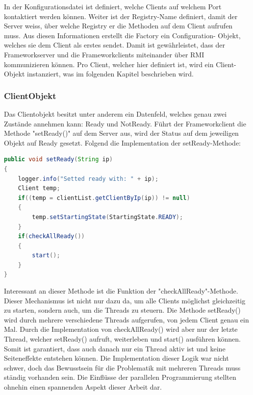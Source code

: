 In der Konfigurationsdatei ist definiert, welche Clients auf welchem Port kontaktiert werden können. Weiter ist der Registry-Name definiert, damit der Server weiss, über welche Registry er die Methoden auf dem Client aufrufen muss. \newline
Aus diesen Informationen erstellt die Factory ein Configuration- Objekt, welches sie dem Client als erstes sendet. Damit ist gewährleistet, dass der Frameworkserver und die Frameworkclients miteinander über RMI kommunizieren können. \newline
Pro Client, welcher hier definiert ist, wird ein Client-Objekt instanziert, was im folgenden Kapitel beschrieben wird.

\subsubsection{ClientObjekt}
\label{sec:ClientObjekt}

Das Clientobjekt besitzt unter anderem ein Datenfeld, welches genau zwei Zustände annehmen kann: Ready und NotReady. Führt der Frameworkclient die Methode "setReady()" auf dem Server aus, wird der Status auf dem jeweiligen Objekt auf Ready gesetzt. Folgend die Implementation der setReady-Methode:
\begin{lstlisting}[language=Java, breaklines=true]
public void setReady(String ip) 
{
	logger.info("Setted ready with: " + ip);
	Client temp;
	if((temp = clientList.getClientByIp(ip)) != null)
	{
		temp.setStartingState(StartingState.READY);
	}
	if(checkAllReady())
	{
		start();
	}
}
\end{lstlisting}

Interessant an dieser Methode ist die Funktion der "checkAllReady"-Methode. Dieser Mecha\-nismus ist nicht nur dazu da, um alle Clients mög\-lichst gleichzeitig zu starten, sondern auch, um die Threads zu steuern. Die Methode setReady() wird durch mehrere verschiedene Threads aufgerufen, von jedem Client genau ein Mal. Durch die Implementation von checkAllReady() wird aber nur der letzte Thread, welcher setReady() aufruft, weiterleben und start() ausführen können. Somit ist garantiert, dass auch danach nur ein Thread aktiv ist und keine Seiteneffekte entstehen können.\newline
Die Implementation dieser Logik war nicht schwer, doch das Bewusstsein für die Problematik mit mehreren Threads muss ständig vorhanden sein. Die Einflüsse der parallelen Programmierung stellten ohnehin einen spannenden Aspekt dieser Arbeit dar. 

